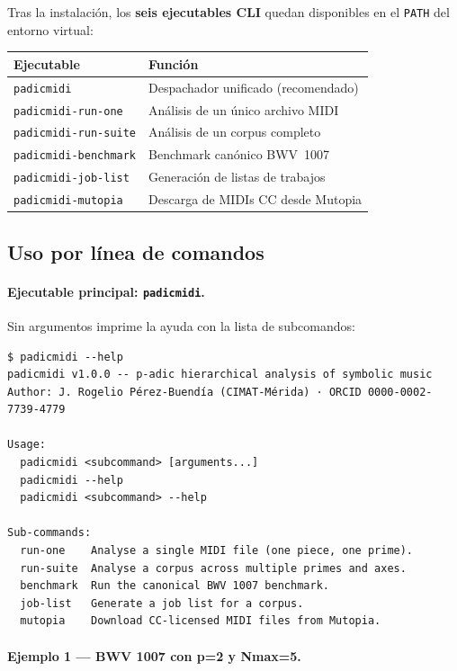 \documentclass[11pt,a4paper,oneside]{article}
\theoremstyle{plain}
\theoremstyle{definition}
\theoremstyle{remark}
\newcommand{\code}[1]{\texttt{\small #1}}
\begin{document}
Tras la instalación, los \textbf{seis ejecutables CLI} quedan
disponibles en el \code{PATH} del entorno virtual:

\begin{tabularx}{\linewidth}{lX}
  \toprule
  \textbf{Ejecutable} & \textbf{Función} \\
  \midrule
  \code{padicmidi}            & Despachador unificado (recomendado) \\
  \code{padicmidi-run-one}    & Análisis de un único archivo MIDI \\
  \code{padicmidi-run-suite}  & Análisis de un corpus completo \\
  \code{padicmidi-benchmark}  & Benchmark canónico BWV~1007 \\
  \code{padicmidi-job-list}   & Generación de listas de trabajos \\
  \code{padicmidi-mutopia}    & Descarga de MIDIs CC desde Mutopia \\
  \bottomrule
\end{tabularx}

\subsection{Uso por línea de comandos}\label{sec:install:cli}

\paragraph{Ejecutable principal: \code{padicmidi}.} Sin argumentos
imprime la ayuda con la lista de subcomandos:

\begin{lstlisting}[style=shell]
$ padicmidi --help
padicmidi v1.0.0 -- p-adic hierarchical analysis of symbolic music
Author: J. Rogelio Pérez-Buendía (CIMAT-Mérida) · ORCID 0000-0002-7739-4779

Usage:
  padicmidi <subcommand> [arguments...]
  padicmidi --help
  padicmidi <subcommand> --help

Sub-commands:
  run-one    Analyse a single MIDI file (one piece, one prime).
  run-suite  Analyse a corpus across multiple primes and axes.
  benchmark  Run the canonical BWV 1007 benchmark.
  job-list   Generate a job list for a corpus.
  mutopia    Download CC-licensed MIDI files from Mutopia.
\end{lstlisting}

\paragraph{Ejemplo 1 --- BWV 1007 con p=2 y Nmax=5.}
\end{document}
